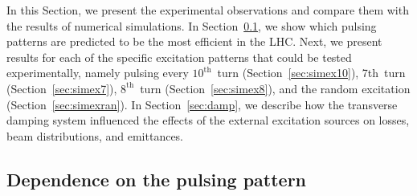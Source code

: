 \documentclass[%
 reprint,
 amsmath,amssymb,
 aps,
prstab,
longbibliography
]{revtex4-1}
\begin{document}
In this Section, we present the experimental observations and compare
them with the results of numerical simulations.  In
Section~\ref{sec:pattern}, we show which pulsing patterns are
predicted to be the most efficient in the LHC.  Next, we present
results for each of the specific excitation patterns that could be
tested experimentally, namely pulsing every $10^{\mathrm{th}}$~turn
(Section~\ref{sec:simex10}), 7th~turn
(Section~\ref{sec:simex7}), $8^{\mathrm{th}}$~turn
(Section~\ref{sec:simex8}), and the random excitation
(Section~\ref{sec:simexran}).  In Section~\ref{sec:damp}, we describe
how the transverse damping system influenced the effects of the
external excitation sources on losses, beam distributions, and
emittances.


\subsection{Dependence on the pulsing pattern}
\label{sec:pattern}
\end{document}
